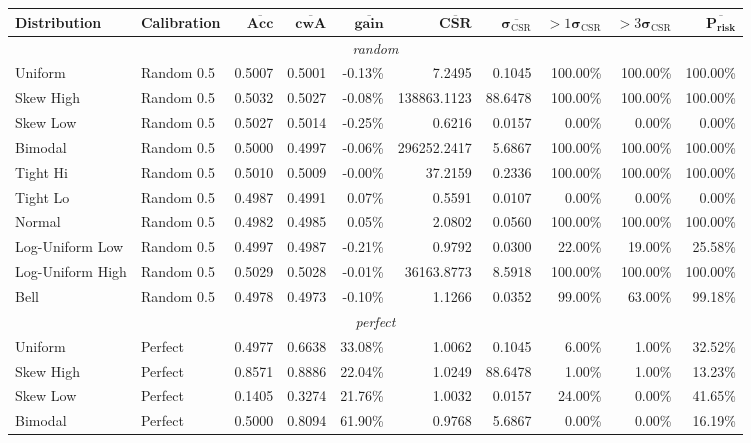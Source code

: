 \documentclass{article}
\theoremstyle{plain}
\theoremstyle{definition}
\theoremstyle{remark}
\begin{document}
\begin{table}[ht]
\centering
\tiny
\begin{tabular}{llrrrrrrrr}
\toprule
\textbf{Distribution} & \textbf{Calibration} & $\overline{\textbf{Acc}}$ & $\overline{\textbf{cwA}}$ & $\overline{\textbf{gain}}$ & $\overline{\textbf{CSR}}$ & $\overline{\boldsymbol{\sigma}_{\mathrm{CSR}}}$ & $>1\boldsymbol{\sigma}_{\mathrm{CSR}}$ &  $>3\boldsymbol{\sigma}_{\mathrm{CSR}}$ & $\overline{\textbf{P}_{\textbf{risk}}}$ \\
\midrule
\multicolumn{10}{c}{\textit{random}} \\
\midrule
Uniform & Random 0.5 & 0.5007 & 0.5001 & -0.13\% & 7.2495 & 0.1045 & 100.00\% & 100.00\% & 100.00\% \\
Skew High & Random 0.5 & 0.5032 & 0.5027 & -0.08\% & 138863.1123 & 88.6478 & 100.00\% & 100.00\% & 100.00\% \\
Skew Low & Random 0.5 & 0.5027 & 0.5014 & -0.25\% & 0.6216 & 0.0157 & 0.00\% & 0.00\% & 0.00\% \\
Bimodal & Random 0.5 & 0.5000 & 0.4997 & -0.06\% & 296252.2417 & 5.6867 & 100.00\% & 100.00\% & 100.00\% \\
Tight Hi & Random 0.5 & 0.5010 & 0.5009 & -0.00\% & 37.2159 & 0.2336 & 100.00\% & 100.00\% & 100.00\% \\
Tight Lo & Random 0.5 & 0.4987 & 0.4991 & 0.07\% & 0.5591 & 0.0107 & 0.00\% & 0.00\% & 0.00\% \\
Normal & Random 0.5 & 0.4982 & 0.4985 & 0.05\% & 2.0802 & 0.0560 & 100.00\% & 100.00\% & 100.00\% \\
Log-Uniform Low & Random 0.5 & 0.4997 & 0.4987 & -0.21\% & 0.9792 & 0.0300 & 22.00\% & 19.00\% & 25.58\% \\
Log-Uniform High & Random 0.5 & 0.5029 & 0.5028 & -0.01\% & 36163.8773 & 8.5918 & 100.00\% & 100.00\% & 100.00\% \\
Bell & Random 0.5 & 0.4978 & 0.4973 & -0.10\% & 1.1266 & 0.0352 & 99.00\% & 63.00\% & 99.18\% \\
\midrule
\multicolumn{10}{c}{\textit{perfect}} \\
\midrule
Uniform & Perfect & 0.4977 & 0.6638 & 33.08\% & 1.0062 & 0.1045 & 6.00\% & 1.00\% & 32.52\% \\
Skew High & Perfect & 0.8571 & 0.8886 & 22.04\% & 1.0249 & 88.6478 & 1.00\% & 1.00\% & 13.23\% \\
Skew Low & Perfect & 0.1405 & 0.3274 & 21.76\% & 1.0032 & 0.0157 & 24.00\% & 0.00\% & 41.65\% \\
Bimodal & Perfect & 0.5000 & 0.8094 & 61.90\% & 0.9768 & 5.6867 & 0.00\% & 0.00\% & 16.19\% \\

\end{tabular}
\end{table}
\end{document}
